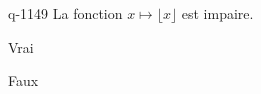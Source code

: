 \begin{truefalse}{q-1149}
La fonction $x\mapsto \lfloor x\rfloor$ est impaire.
\item Vrai
\item* Faux
\end{truefalse}

